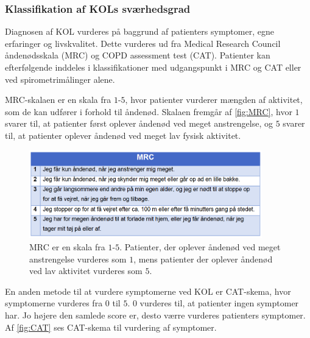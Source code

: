 \subsubsection{Klassifikation af KOLs sværhedsgrad}
Diagnosen af KOL vurderes på baggrund af patienters symptomer, egne erfaringer og livskvalitet. Dette vurderes ud fra Medical Research Council åndenødsskala (MRC) og COPD assessment test (CAT). Patienter kan efterfølgende inddeles i klassifikationer med udgangspunkt i MRC og CAT eller ved spirometrimålinger alene.\cite{Basisbogen2016}

 
MRC-skalaen er en skala fra $1$-$5$, hvor patienter vurderer mængden af aktivitet, som de kan udfører i forhold til åndenød. Skalaen fremgår af \autoref{fig:MRC}, hvor $1$ svarer til, at patienter først oplever åndenød ved meget anstrengelse, og $5$ svarer til, at patienter oplever åndenød ved meget lav fysisk aktivitet. \cite{Basisbogen2016}

\begin{figure} [H]
\centering
\includegraphics[width=0.9\textwidth]{figures/MRC}
\caption{MRC er en skala fra $1$-$5$. Patienter, der oplever åndenød ved meget anstrengelse vurderes som $1$, mens patienter der oplever åndenød ved lav aktivitet vurderes som $5$.}
\label{fig:MRC}
\end{figure} 

\noindent
En anden metode til at vurdere symptomerne ved KOL er  CAT-skema, hvor symptomerne vurderes fra $0$ til $5$. $0$ vurderes til, at patienter ingen symptomer har. Jo højere den samlede score er, desto værre vurderes patienters symptomer. Af \autoref{fig:CAT} ses CAT-skema til vurdering af symptomer.\cite{dsam2016,Basisbogen2016}

